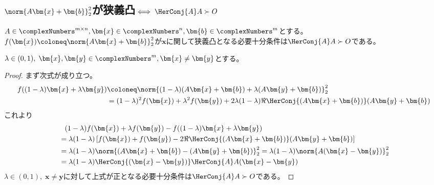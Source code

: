         \subsection{\texorpdfstring{$\norm{A\bm{x}+\bm{b}}_2^2$}{||Ax+b||\string^2}が狭義凸\texorpdfstring{$\iff \HerConj{A}A\succ O$}{⇔ A*Aが正定}}
            \begin{shadebox}
                $A \in \complexNumbers^{m\times n}, \bm{x} \in \complexNumbers^n, \bm{b} \in \complexNumbers^m$とする。
                $f(\bm{x}) \coloneq \norm{A\bm{x}+\bm{b}}_2^2$が$\bm{x}$に関して狭義凸となる必要十分条件は$\HerConj{A}A\succ O$である。
            \end{shadebox}
            $\lambda \in (0,1),\; \bm{x},\bm{y} \in \complexNumbers^m, \bm{x}\neq\bm{y}$とする。
            \begin{proof}
                まず次式が成り立つ。
                \begin{align*}
                    f((1-\lambda)\bm{x} + \lambda\bm{y}) &\coloneq \norm{(1-\lambda)(A\bm{x}+\bm{b}) + \lambda(A\bm{y}+\bm{b})}_2^2 \\
                    &= (1-\lambda)^2 f(\bm{x}) + \lambda^2 f(\bm{y}) + 2\lambda(1-\lambda)\Re{\HerConj{(A\bm{x}+\bm{b})}(A\bm{y}+\bm{b})}
                \end{align*}
                これより
                \begin{align*}
                    &\phantom{=} (1-\lambda)f(\bm{x}) + \lambda f(\bm{y}) - f((1-\lambda)\bm{x} + \lambda\bm{y}) \\
                    &= \lambda(1-\lambda)\left[f(\bm{x}) + f(\bm{y}) - 2\Re{\HerConj{(A\bm{x}+\bm{b})}(A\bm{y}+\bm{b})}\right] \\
                    &= \lambda(1-\lambda)\norm{(A\bm{x}+\bm{b}) - (A\bm{y}+\bm{b})}_2^2 = \lambda(1-\lambda)\norm{A(\bm{x}-\bm{y})}_2^2 \\
                    &= \lambda(1-\lambda)\HerConj{(\bm{x}-\bm{y})}\HerConj{A}A(\bm{x}-\bm{y})
                \end{align*}
                $\lambda \in (0,1),\;\bm{x}\neq\bm{y}$に対して上式が正となる必要十分条件は$\HerConj{A}A\succ O$である。
            \end{proof}